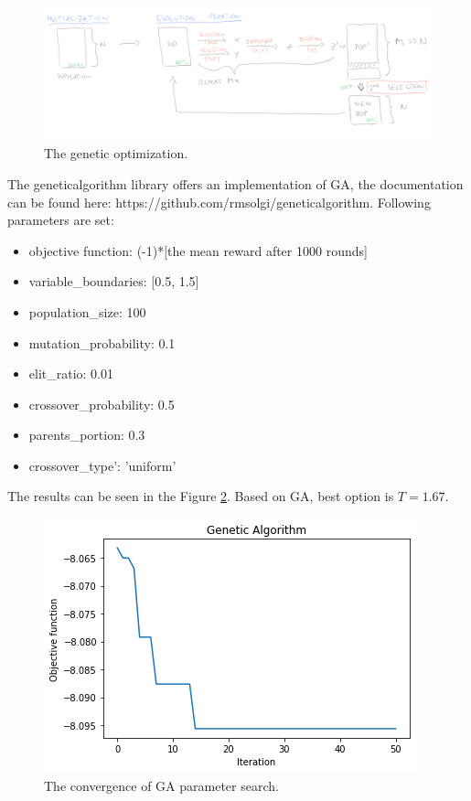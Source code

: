 \documentclass[11pt,american,czech]{article}
\begin{document}
\begin{figure}[h]
	\centering
	\includegraphics[scale=0.5]{go_overview.png}
	\caption{The genetic optimization.}\label{fig::ga}
\end{figure}

 The geneticalgorithm library offers an implementation of GA, the documentation can be found here: https://github.com/rmsolgi/geneticalgorithm. Following parameters are set:
 \begin{itemize}
 	\item objective function: (-1)*[the mean reward after 1000 rounds]
 	\item variable\_boundaries: [0.5, 1.5]
 	\item population\_size: 100
 	\item mutation\_probability: 0.1
 	\item elit\_ratio: 0.01
 	\item crossover\_probability: 0.5
 	\item parents\_portion: 0.3
 	\item crossover\_type': 'uniform'
 \end{itemize}

The results can be seen in the Figure \ref{fig::gaO}. Based on GA, best option is $T=1.67$. 

\begin{figure}[h]
	\centering
	\includegraphics[scale=0.6]{ga1.png}
	\caption{The convergence of GA parameter search.}\label{fig::gaO}
\end{figure}
\end{document}
